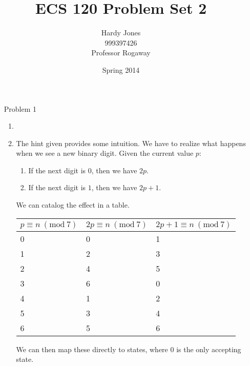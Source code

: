 \documentclass[12pt,letterpaper]{article}
\title{ECS 120 Problem Set 2\vspace{-2ex}}
\author{Hardy Jones\\
        999397426\\
        Professor Rogaway\vspace{-2ex}}
\date{Spring 2014}
\newcommand{\Mod}[1]{\ (\text{mod}\ #1)}
\begin{document}
  \maketitle

  \begin{enumerate}
    \item[Problem 1]
      \begin{enumerate}
        \item
        \item
          The hint given provides some intuition.
          We have to realize what happens when we see a new binary digit.
          Given the current value $p$:
            \begin{enumerate}
              \item If the next digit is $0$, then we have $2p$.
              \item If the next digit is $1$, then we have $2p+1$.
            \end{enumerate}
          We can catalog the effect in a table.

          \begin{tabular}{l | l | l}
            $p \equiv n \Mod{7}$ & $2p \equiv n \Mod{7}$ & $2p + 1 \equiv n \Mod{7}$ \\
            \hline
            0 & 0 & 1 \\
            1 & 2 & 3 \\
            2 & 4 & 5 \\
            3 & 6 & 0 \\
            4 & 1 & 2 \\
            5 & 3 & 4 \\
            6 & 5 & 6
          \end{tabular}

          We can then map these directly to states, where $0$ is the only accepting state.


\end{enumerate}
\end{enumerate}
\end{document}
